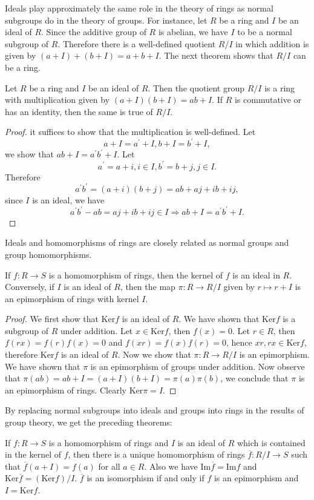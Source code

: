 Ideals play approximately the same role in the theory of rings as normal subgroups do in the theory of groups. For instance, let $R$ be a ring and $I$ be an ideal of $R$. Since the additive group of $R$ is abelian, we have $I$ to be a normal subgroup of $R$. Therefore there is a well-defined quotient $R/I$ in which addition is given by $(a+I)+(b+I)=a+b+I$. The next theorem shows that $R/I$ can be a ring.
\begin{theorem}
Let $R$ be a ring and $I$ be an ideal of $R$. Then the quotient group $R/I$ is a ring with multiplication given by $(a+I)(b+I)=ab+I$. If $R$ is commutative or has an identity, then the same is true of $R/I$.
\end{theorem}
\begin{proof}
it suffices to show that the multiplication is well-defined. Let 
$$
a+I=a^{\prime}+I,b+I=b^{\prime}+I,
$$
we show that $ab+I=a^\prime b^\prime+I$. Let 
$$
a^{\prime}=a+i,i\in I,b^{\prime}=b+j,j\in I.
$$
Therefore 
$$
a^{\prime}b^{\prime}=\left( a+i \right) \left( b+j \right) =ab+aj+ib+ij,
$$
since $I$ is an ideal, we have 
$$
a^{\prime}b^{\prime}-ab=aj+ib+ij\in I\Rightarrow ab+I=a^{\prime}b^{\prime}+I.
$$
\end{proof}
Ideals and homomorphisms of rings are closely related as normal groups and group homomorphisms.
\begin{theorem}
If $f:R\to S$ is a homomorphism of rings, then the kernel of $f$ is an ideal in $R$. Conversely, if $I$ is an ideal of $R$, then the map $\pi:R\to R/I$ given by $r\mapsto r+I$ is an epimorphism of rings with kernel $I$.
\end{theorem}
\begin{proof}
We first show that $\mathrm{Ker}f$ is an ideal of $R$. We have shown that $\mathrm{Ker}f$ is a subgroup of $R$ under addition. Let $x\in\mathrm{Ker}f$, then $f(x)=0$. Let $r\in R$, then $f(rx)=f(r)f(x)=0$ and $f(xr)=f(x)f(r)=0$, hence $xr,rx\in\mathrm{Ker}f$, therefore $\mathrm{Ker}f$ is an ideal of $R$. Now we show that $\pi:R\to R/I$ is an epimorphism. We have shown that $\pi$ is an epimorphism of groups under addition. Now observe that $\pi(ab)=ab+I=(a+I)(b+I)=\pi(a)\pi(b)$, we conclude that $\pi$ is an epimorphism of rings. Clearly $\mathrm{Ker}\pi=I$.
\end{proof}
By replacing normal subgroups into ideals and groups into rings in the results of group theory, we get the preceding theorems:
\begin{theorem}
If $f:R\to S$ is a homomorphism of rings and $I$ is an ideal of $R$ which is contained in the kernel of $f$, then there is a unique homomorphism of rings $\overline{f}:R/I\to S$ such that $\overline{f}(a+I)=f(a)$ for all $a\in R$. Also we have $\mathrm{Im}\overline{f}=\mathrm{Im}f$ and $\mathrm{Ker}\overline{f}=(\mathrm{Ker}f)/I$. $\overline{f}$ is an isomorphism if and only if $f$ is an epimorphism and $I=\mathrm{Ker}f$.
\end{theorem}
